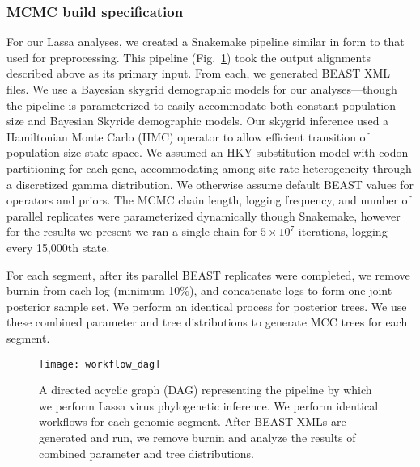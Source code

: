 \subsubsection{MCMC build specification}

For our Lassa analyses, we created a Snakemake pipeline similar in form to that used for preprocessing.
This pipeline (Fig.~\ref{fig:workflow_dag}) took the output alignments described above as its primary input.
From each, we generated BEAST XML files.
We use a Bayesian skygrid demographic models for our analyses---though the pipeline is parameterized to easily accommodate both constant population size and Bayesian Skyride demographic models.
Our skygrid inference used a Hamiltonian Monte Carlo (HMC) operator to allow efficient transition of population size state space. %
We assumed an HKY substitution model with codon partitioning for each gene, accommodating among-site rate heterogeneity through a discretized gamma distribution.
We otherwise assume default BEAST values for operators and priors.
The MCMC chain length, logging frequency, and number of parallel replicates were parameterized dynamically though Snakemake, however for the results we present we ran a single chain for $5\times10^7$ iterations, logging every 15,000th state.

For each segment, after its parallel BEAST replicates were completed, we remove burnin from each log (minimum 10\%), and concatenate logs to form one joint posterior sample set.
We perform an identical process for posterior trees.
We use these combined parameter and tree distributions to generate MCC trees for each segment.

\begin{figure}[ht]
  \centering
  \medskip
  \texttt{[image: workflow\_dag]}
  \caption[Lassa phylogenetics pipeline]{A directed acyclic graph (DAG) representing the pipeline by which we perform Lassa virus phylogenetic inference. We perform identical workflows for each genomic segment. After BEAST XMLs are generated and run, we remove burnin and analyze the results of combined parameter and tree distributions.}
  \label{fig:workflow_dag}
\end{figure}

\cleardoublepage

